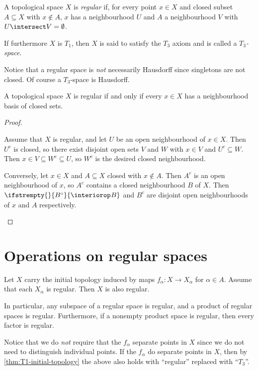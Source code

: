 \documentclass[article, a4paper, 11pt, oneside]{memoir}
\numberwithin{equation}{chapter}
\renewcommand\interior[2][]{%
    \ifstrempty{#1}{%
        #2^{\circ}
    }{%
        \interiorop_{#1}#2
    }%
}
\begin{document}
\begin{definition}
    A topological space $X$ is \emph{regular} if, for every point $x \in X$ and closed subset $A \subseteq X$ with $x \not\in A$, $x$ has a neighbourhood $U$ and $A$ a neighbourhood $V$ with $U \intersect V = \emptyset$.

    If furthermore $X$ is $T_1$, then $X$ is said to satisfy the $T_3$ axiom and is called a \emph{$T_3$-space}.
\end{definition}
%
Notice that a regular space is \emph{not} necessarily Hausdorff since singletons are not closed. Of course a $T_3$-space is Hausdorff.


\begin{proposition}
    \label{thm:regular-equivalent-properties}
    A topological space $X$ is regular if and only if every $x \in X$ has a neighbourhood basis of closed sets.
\end{proposition}

\begin{proof}
\begin{proofsec}
    Assume that $X$ is regular, and let $U$ be an open neighbourhood of $x \in X$. Then $U^c$ is closed, so there exist disjoint open sets $V$ and $W$ with $x \in V$ and $U^c \subseteq W$. Then $x \in V \subseteq W^c \subseteq U$, so $W^c$ is the desired closed neighbourhood.

    Conversely, let $x \in X$ and $A \subseteq X$ closed with $x \not\in A$. Then $A^c$ is an open neighbourhood of $x$, so $A^c$ contains a closed neighbourhood $B$ of $X$. Then $\interior{B}$ and $B^c$ are disjoint open neighbourhoods of $x$ and $A$ respectively.
\end{proofsec}
\end{proof}


\section{Operations on regular spaces}

\begin{proposition}
    \label{thm:regular-initial-topology}
    Let $X$ carry the initial topology induced by maps $f_\alpha \colon X \to X_\alpha$ for $\alpha \in A$. Assume that each $X_\alpha$ is regular. Then $X$ is also regular.

    In particular, any subspace of a regular space is regular, and a product of regular spaces is regular. Furthermore, if a nonempty product space is regular, then every factor is regular.
\end{proposition}
%
Notice that we do \emph{not} require that the $f_\alpha$ separate points in $X$ since we do not need to distinguish individual points. If the $f_\alpha$ do separate points in $X$, then by \cref{thm:T1-initial-topology} the above also holds with \enquote{regular} replaced with \enquote{$T_3$}.
\end{document}

